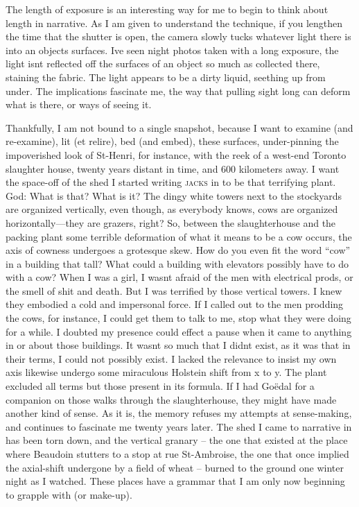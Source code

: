 \documentclass[
]{memoir}
\begin{document}
The length of exposure is an interesting way for me to begin to think
about length in narrative. As I am given to understand the technique, if
you lengthen the time that the shutter is open, the camera slowly tucks
whatever light there is into an objects surfaces. Ive seen night photos
taken with a long exposure, the light isnt reflected off the surfaces of
an object so much as collected there, staining the fabric. The light
appears to be a dirty liquid, seething up from under. The implications
fascinate me, the way that pulling sight long can deform what is there,
or ways of seeing it.

Thankfully, I am not bound to a single snapshot, because I want to
examine (and re-examine), lit (et relire), bed (and embed), these
surfaces, under-pinning the impoverished look of St-Henri, for instance,
with the reek of a west-end Toronto slaughter house, twenty years
distant in time, and 600 kilometers away. I want the space-off of the
shed I started writing \textsc{jacks} in to be that terrifying plant.
God: What is that? What is it? The dingy white towers next to the
stockyards are organized vertically, even though, as everybody knows,
cows are organized horizontally---they are grazers, right? So, between
the slaughterhouse and the packing plant some terrible deformation of
what it means to be a cow occurs, the axis of cowness undergoes a
grotesque skew. How do you even fit the word ``cow'' in a building that
tall? What could a building with elevators possibly have to do with a
cow? When I was a girl, I wasnt afraid of the men with electrical prods,
or the smell of shit and death. But I was terrified by those vertical
towers. I knew they embodied a cold and impersonal force. If I called
out to the men prodding the cows, for instance, I could get them to talk
to me, stop what they were doing for a while. I doubted my presence
could effect a pause when it came to anything in or about those
buildings. It wasnt so much that I didnt exist, as it was that in their
terms, I could not possibly exist. I lacked the relevance to insist my
own axis likewise undergo some miraculous Holstein shift from x to y.
The plant excluded all terms but those present in its formula. If I had
Goëdal for a companion on those walks through the slaughterhouse, they
might have made another kind of sense. As it is, the memory refuses my
attempts at sense-making, and continues to fascinate me twenty years
later. The shed I came to narrative in has been torn down, and the
vertical granary -- the one that existed at the place where Beaudoin
stutters to a stop at rue St-Ambroise, the one that once implied the
axial-shift undergone by a field of wheat -- burned to the ground one
winter night as I watched. These places have a grammar that I am only
now beginning to grapple with (or make-up).
\end{document}
